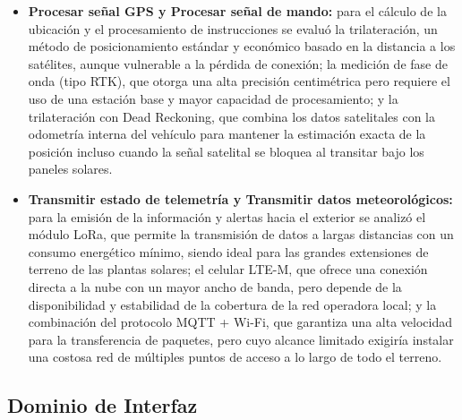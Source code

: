 \begin{itemize}
	\item \textbf{Procesar señal GPS y Procesar señal de mando:} para el cálculo de la ubicación y el procesamiento de instrucciones se evaluó la trilateración, un método de posicionamiento estándar y económico basado en la distancia a los satélites, aunque vulnerable a la pérdida de conexión; la medición de fase de onda (tipo RTK), que otorga una alta precisión centimétrica pero requiere el uso de una estación base y mayor capacidad de procesamiento; y la trilateración con Dead Reckoning, que combina los datos satelitales con la odometría interna del vehículo para mantener la estimación exacta de la posición incluso cuando la señal satelital se bloquea al transitar bajo los paneles solares.
	
	\item \textbf{Transmitir estado de telemetría y Transmitir datos meteorológicos:} para la emisión de la información y alertas hacia el exterior se analizó el módulo LoRa, que permite la transmisión de datos a largas distancias con un consumo energético mínimo, siendo ideal para las grandes extensiones de terreno de las plantas solares; el celular LTE-M, que ofrece una conexión directa a la nube con un mayor ancho de banda, pero depende de la disponibilidad y estabilidad de la cobertura de la red operadora local; y la combinación del protocolo MQTT + Wi-Fi, que garantiza una alta velocidad para la transferencia de paquetes, pero cuyo alcance limitado exigiría instalar una costosa red de múltiples puntos de acceso a lo largo de todo el terreno.
\end{itemize}

\subsection{Dominio de Interfaz}

